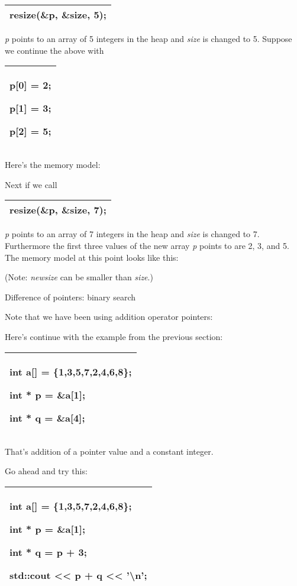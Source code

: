 \documentclass[
]{article}
\begin{document}
\begin{longtable}[]{@{}l@{}}
\toprule
\endhead
resize(\&p, \&size, 5);\tabularnewline
\bottomrule
\end{longtable}

\emph{p} points to an array of 5 integers in the heap and \emph{size} is
changed to 5. Suppose we continue the above with

\begin{longtable}[]{@{}l@{}}
\toprule
\endhead
\begin{minipage}[t]{0.97\columnwidth}\raggedright
p{[}0{]} = 2;

p{[}1{]} = 3;

p{[}2{]} = 5;\strut
\end{minipage}\tabularnewline
\bottomrule
\end{longtable}

Here's the memory model:

Next if we call

\begin{longtable}[]{@{}l@{}}
\toprule
\endhead
resize(\&p, \&size, 7);\tabularnewline
\bottomrule
\end{longtable}

\emph{p} points to an array of 7 integers in the heap and \emph{size} is
changed to 7. Furthermore the first three values of the new array
\emph{p} points to are 2, 3, and 5. The memory model at this point looks
like this:

(Note: \emph{newsize} can be smaller than \emph{size}.)

Difference of pointers: binary search

Note that we have been using addition operator pointers:

Here's continue with the example from the previous section:

\begin{longtable}[]{@{}l@{}}
\toprule
\endhead
\begin{minipage}[t]{0.97\columnwidth}\raggedright
int a{[}{]} = \{1,3,5,7,2,4,6,8\};

int * p = \&a{[}1{]};

int * q = \&a{[}4{]}; \strut
\end{minipage}\tabularnewline
\bottomrule
\end{longtable}

That's addition of a pointer value and a constant integer.

Go ahead and try this:

\begin{longtable}[]{@{}l@{}}
\toprule
\endhead
\begin{minipage}[t]{0.97\columnwidth}\raggedright
int a{[}{]} = \{1,3,5,7,2,4,6,8\};

int * p = \&a{[}1{]};

int * q = p + 3;

std::cout \textless\textless{} \textbf{p + q} \textless\textless{}
'\textbackslash n';\strut
\end{minipage}\tabularnewline
\bottomrule
\end{longtable}
\end{document}
